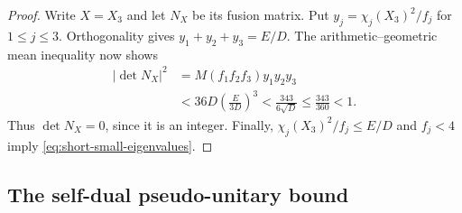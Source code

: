 \documentclass[11pt]{amsart}
\theoremstyle{definition}
\numberwithin{equation}{section}
\begin{document}
\begin{proof}
Write $X=X_3$ and let $N_X$ be its fusion matrix. Put
$y_j=\chi_j(X_3)^2/f_j$ for $1\leq j\leq3$.
Orthogonality gives $y_1+y_2+y_3=E/D$. The arithmetic--geometric mean
inequality now shows
\begin{align*}
 |\det N_X|^2
 &=M(f_1f_2f_3)y_1y_2y_3\\
 &<36D\left(\frac{E}{3D}\right)^3
 <\frac{343}{6\sqrt D}\leq\frac{343}{360}<1.
\end{align*}
Thus $\det N_X=0$, since it is an integer. Finally,
$\chi_j(X_3)^2/f_j\leq E/D$ and $f_j<4$ imply
\eqref{eq:short-small-eigenvalues}.
\end{proof}

\subsection{The self-dual pseudo-unitary bound}\label{sec:pu}
\end{document}
